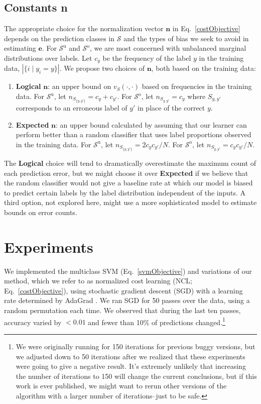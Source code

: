 \documentclass{article} %
\newcommand{\unorderedS}{\mathcal{S}^{\mathrm{u}}}
\newcommand{\orderedS}{\mathcal{S}^{\mathrm{o}}}
\newcommand{\ourmethod}{NCL}
\begin{document}
\subsection{Constants \textbf{n}}

The appropriate choice for the normalization vector $\mathbf{n}$ in 
Eq.~\ref{costObjective} depends on the prediction classes in
$\mathcal{S}$ and the types of bias we seek to avoid in estimating $\mathbf{e}$.
For $\unorderedS$ and $\orderedS$, we are most concerned with
unbalanced marginal distributions over labels.  
Let $c_y$ be the frequency of the label $y$ in the training data,
$|\{i \mid y_i = y\}|$.
We propose two choices
of $\mathbf{n}$, both based on the training data:
\begin{enumerate}
\item \textbf{Logical} $\mathbf{n}$:  an upper bound on $v_S(\cdot,
  \cdot)$ based on frequencies in the training data.  For $\unorderedS$, let
  $n_{S_{\{y,y'\}}} = c_y+c_{y'}$.  For
  $\orderedS$, let $n_{S_{y, y'}} = c_y$ where
  $S_{y,y'}$ corresponds to an erroneous label of $y'$ in place of the
  correct $y$.
\item \textbf{Expected} $\mathbf{n}$:  an upper bound calculated by
  assuming that our learner can perform better than a random
  classifier that uses label proportions observed in the training
  data.    For $\unorderedS$, let $n_{S_{\{y,y'\}}} = 2c_y c_{y'} / N$.  For
  $\orderedS$, let $n_{S_{y,y'}} =  c_y c_{y'} / N$. 
\end{enumerate}

 The \textbf{Logical} choice
will tend to dramatically overestimate the maximum count of each
prediction error,
but we might choose it over \textbf{Expected} if we
believe that the random classifier would not give a baseline rate at
which our model is biased to predict certain labels by the label
distribution independent of the inputs.
A third option, not explored here, might use a more sophisticated
model to estimate bounds on error counts.

\section{Experiments}

We implemented the multiclass SVM (Eq.~\ref{svmObjective}) and
variations of our method, which we refer to as
normalized cost learning (\ourmethod{}; Eq.~\ref{costObjective}), using
stochastic  gradient descent (SGD) with a learning rate determined
by AdaGrad \citep{yin2003stochastic}\citep{duchi2011adaptive}.
We ran SGD for 50 passes over the data, using a
random permutation each time.  We observed that during the last ten
passes, accuracy varied by $<
0.01$ and fewer than 10\% of predictions changed.\footnote{
We were originally running for 150 iterations for previous buggy
versions, but we adjusted down to 50 iterations after we realized
that these experiments were going to give a negative result.  It's
extremely unlikely that increasing the number of iterations to 150 will
change the current conclusions, but if this work is ever published,
we might want to rerun other versions of the algorithm with a larger
number of iterations--just to be safe.
}
\end{document}
